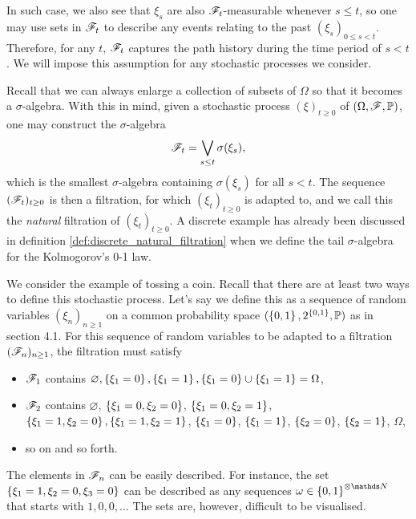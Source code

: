 In such case, we also see that $\xi_s$ are also $\mathcal{F}_t$-measurable whenever $s \leq t$, so one may use sets in $\mathcal{F}_t$ to describe any events relating to the past $(\xi_s)_{0\leq s < t}$. Therefore, for any $t$, $\mathcal{F}_t$ captures the path history during the time period of $s < t$. We will impose this assumption for any stochastic processes we consider.

\begin{example}
Recall that we can always enlarge a collection of subsets of $\Omega$ so that it becomes a $\sigma$-algebra. With this in mind, given a stochastic process $(\xi)_{t\geq 0}$ of $(\Omega,\mathcal{F},\mathbb{P})$, one may construct the $\sigma$-algebra
\begin{equation}
    \mathcal{F}_t = \bigvee_{s \leq t} \sigma(\xi_s),
\end{equation}
which is the smallest $\sigma$-algebra containing $\sigma(\xi_s)$ for all $s<t$. The sequence $(\mathcal{F}_t)_{t\geq 0}$ is then a filtration, for which $(\xi_t)_{t\geq 0}$ is adapted to, and we call this the \textit{natural} filtration of $(\xi_t)_{t\geq 0}$. A discrete example has already been discussed in definition \ref{def:discrete_natural_filtration} when we define the tail $\sigma$-algebra for the Kolmogorov's 0-1 law.
\end{example}

We consider the example of tossing a coin. Recall that there are at least two ways to define this stochastic process. Let's say we define this as a sequence of random variables $(\xi_n)_{n\geq 1}$ on a common probability space $(\left\{ 0,1 \right \}, 2^{\left\{ 0,1 \right \}},\mathbb{P})$ as in section 4.1. For this sequence of random variables to be adapted to a filtration $(\mathcal{F}_n)_{n\geq 1}$, the filtration must satisfy

\begin{itemize}
    \item $\mathcal{F}_1$ contains $\varnothing, \left\{ \xi_1 = 0 \right \}, \left\{ \xi_1 = 1 \right \}, \left\{ \xi_1 = 0 \right \} \cup \left\{ \xi_1 = 1 \right \} = \Omega$,
    \item $\mathcal{F}_2$ contains $\varnothing$, $\left\{ \xi_1 = 0, \xi_2 = 0 \right \}$, $\left\{ \xi_1 = 0, \xi_2 = 1 \right \}$, $\left\{ \xi_1 = 1, \xi_2 = 0 \right \}, \left\{ \xi_1 = 1, \xi_2 = 1 \right \}$, $\left\{ \xi_1 = 0 \right \}$, $\left\{ \xi_1 = 1 \right \}$, $\left\{ \xi_2 = 0 \right \}$, $\left\{ \xi_2 = 1 \right \}$, $\Omega$,
    \item so on and so forth.
\end{itemize}

The elements in $\mathcal{F}_n$ can be easily described. For instance, the set $\left\{ \xi_1 = 1, \xi_2 = 0, \xi_3 = 0 \right \}$ can be described as any sequences $\omega \in \set{0,1}^{\otimes \N}$ that starts with $1, 0, 0, ...$ The sets are, however, difficult to be visualised.

